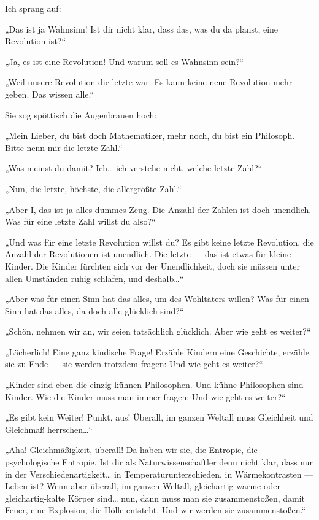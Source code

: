 Ich sprang auf:

„Das ist ja Wahnsinn! Ist dir nicht klar, dass das, was du da
planst, eine Revolution ist?“

„Ja, es ist eine Revolution! Und warum soll es Wahnsinn sein?“

„Weil unsere Revolution die letzte war. Es kann keine neue
Revolution mehr geben. Das wissen alle.“

Sie zog spöttisch die Augenbrauen hoch:

„Mein Lieber, du bist doch Mathematiker, mehr
noch, du bist ein Philosoph. Bitte nenn mir die letzte Zahl.“

„Was
meinst du damit? Ich\ldots{} ich verstehe nicht, welche letzte Zahl?“

„Nun, die letzte, höchste, die allergrößte Zahl.“

„Aber I, das ist
ja alles dummes Zeug. Die Anzahl der Zahlen ist doch unendlich. Was
für eine letzte Zahl willst du also?“

„Und was für eine letzte Revolution willst du? Es gibt keine letzte
Revolution, die Anzahl der Revolutionen ist unendlich. Die letzte —
das ist etwas für kleine Kinder. Die Kinder fürchten sich vor der
Unendlichkeit, doch sie müssen unter allen Umständen ruhig
schlafen, und deshalb\ldots{}“

„Aber was für einen Sinn hat das alles, um des Wohltäters willen?
Was für einen Sinn hat das alles, da doch alle glücklich sind?“

„Schön, nehmen wir an, wir seien tatsächlich glücklich. Aber wie
geht es weiter?“

„Lächerlich! Eine ganz kindische Frage! Erzähle Kindern eine
Geschichte, erzähle sie zu Ende — sie werden trotzdem fragen: Und
wie geht es weiter?“

„Kinder sind eben die einzig kühnen
Philosophen. Und kühne Philosophen sind Kinder. Wie die Kinder muss
man immer fragen: Und wie geht es weiter?“

„Es gibt kein Weiter! Punkt, aus! Überall, im ganzen Weltall muss
Gleichheit und Gleichmaß herrschen\ldots{}“

„Aha! Gleichmäßigkeit,
überall! Da haben wir sie, die Entropie, die psychologische
Entropie. Ist dir als Naturwissenschaftler denn nicht klar, dass
nur in der Verschiedenartigkeit\ldots{} in Temperaturunterschieden, in
Wärmekontrasten — Leben ist? Wenn aber überall, im ganzen Weltall,
gleichartig-warme oder gleichartig-kalte Körper sind\ldots{} nun, dann
muss man sie zusammenstoßen, damit Feuer, eine Explosion, die Hölle
entsteht. Und wir werden sie zusammenstoßen.“

